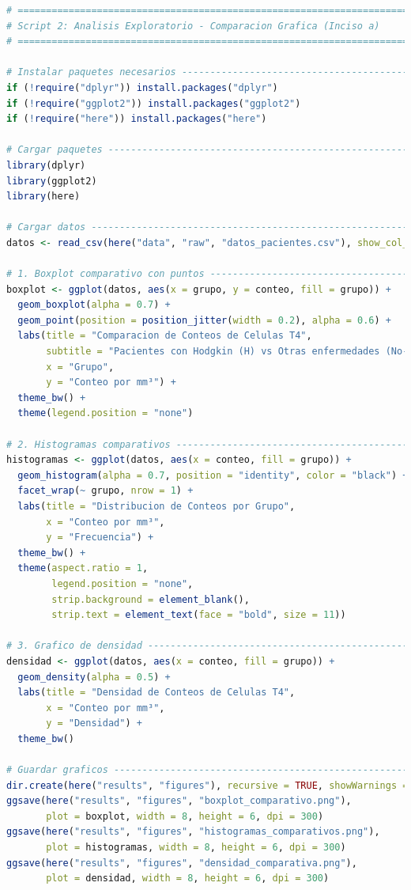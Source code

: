 \begin{lstlisting}[language=R, caption={Script 2: Analisis Exploratorio - Comparacion Grafica (Inciso a).}, label={lst:script2}]
# =============================================================================
# Script 2: Analisis Exploratorio - Comparacion Grafica (Inciso a)
# =============================================================================

# Instalar paquetes necesarios ------------------------------------------------
if (!require("dplyr")) install.packages("dplyr")
if (!require("ggplot2")) install.packages("ggplot2")
if (!require("here")) install.packages("here")

# Cargar paquetes -------------------------------------------------------------
library(dplyr)
library(ggplot2)
library(here)

# Cargar datos ----------------------------------------------------------------
datos <- read_csv(here("data", "raw", "datos_pacientes.csv"), show_col_types = FALSE)

# 1. Boxplot comparativo con puntos -------------------------------------------
boxplot <- ggplot(datos, aes(x = grupo, y = conteo, fill = grupo)) +
  geom_boxplot(alpha = 0.7) +
  geom_point(position = position_jitter(width = 0.2), alpha = 0.6) +
  labs(title = "Comparacion de Conteos de Celulas T4",
       subtitle = "Pacientes con Hodgkin (H) vs Otras enfermedades (No-H)",
       x = "Grupo",
       y = "Conteo por mm³") +
  theme_bw() +
  theme(legend.position = "none")

# 2. Histogramas comparativos -------------------------------------------------
histogramas <- ggplot(datos, aes(x = conteo, fill = grupo)) +
  geom_histogram(alpha = 0.7, position = "identity", color = "black") +
  facet_wrap(~ grupo, nrow = 1) +  
  labs(title = "Distribucion de Conteos por Grupo",
       x = "Conteo por mm³",
       y = "Frecuencia") +
  theme_bw() +
  theme(aspect.ratio = 1,
        legend.position = "none",
        strip.background = element_blank(),  
        strip.text = element_text(face = "bold", size = 11)) 

# 3. Grafico de densidad ------------------------------------------------------
densidad <- ggplot(datos, aes(x = conteo, fill = grupo)) +
  geom_density(alpha = 0.5) +
  labs(title = "Densidad de Conteos de Celulas T4",
       x = "Conteo por mm³",
       y = "Densidad") +
  theme_bw()

# Guardar graficos ------------------------------------------------------------
dir.create(here("results", "figures"), recursive = TRUE, showWarnings = FALSE)
ggsave(here("results", "figures", "boxplot_comparativo.png"), 
       plot = boxplot, width = 8, height = 6, dpi = 300)
ggsave(here("results", "figures", "histogramas_comparativos.png"), 
       plot = histogramas, width = 8, height = 6, dpi = 300)
ggsave(here("results", "figures", "densidad_comparativa.png"), 
       plot = densidad, width = 8, height = 6, dpi = 300)


\end{lstlisting}
